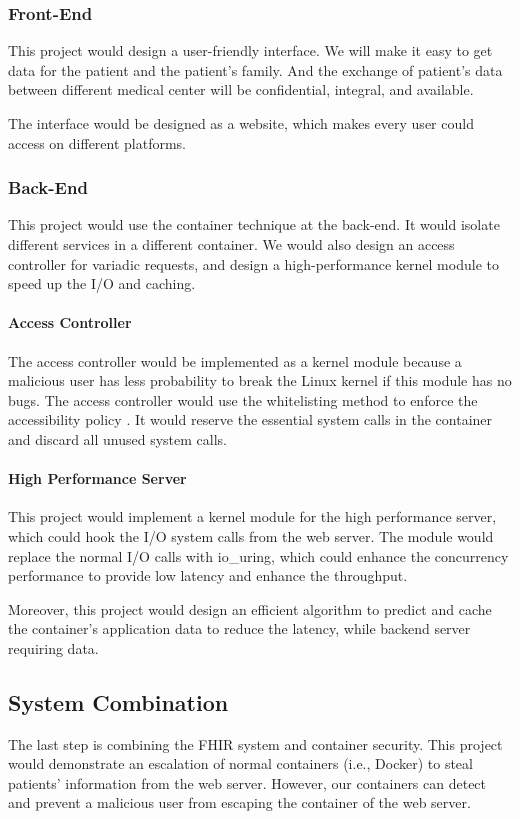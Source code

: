 \documentclass[12pt,a4paper]{article}
\begin{document}
\subsubsection{Front-End}
This project would design a user-friendly interface. We will make it easy to get data for the
patient and the patient's family. And the exchange of patient's data between different
medical center will be confidential, integral, and available.

The interface would be designed as a website, which makes every user could access on different
platforms.

\subsubsection{Back-End}
This project would use the container technique at the back-end. It would isolate different
services in a different container. We would also design an access controller for variadic
requests, and design a high-performance kernel module to speed up the I/O and caching.

\paragraph{Access Controller}
The access controller would be implemented as a kernel module because a malicious user has
less probability to break the Linux kernel if this module has no bugs.
The access controller would use the whitelisting method to enforce the accessibility policy
\cite{Access_Control_Architecture}.
It would reserve the essential system calls in the container and discard all unused system calls.

\paragraph{High Performance Server}
This project would implement a kernel module for the high performance server, which could hook
the I/O system calls from the web server. The module would replace the normal I/O calls with
io\_uring, which could enhance the concurrency performance to provide low latency and enhance
the throughput.

Moreover, this project would design an efficient algorithm to predict and cache the container's
application data to reduce the latency, while backend server requiring data.

\subsection{System Combination}
The last step is combining the FHIR system and container security. This project would demonstrate
an escalation of normal containers (i.e., Docker) to steal patients' information from the web server.
However, our containers can detect and prevent a malicious user from escaping the container of the
web server.
\end{document}
